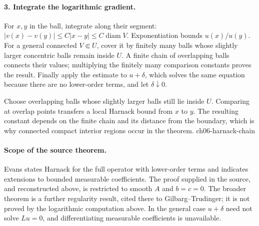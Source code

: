 \begin{expandedproof}
\paragraph{3. Integrate the logarithmic gradient.}
For $x,y$ in the ball, integrate along their segment:
$|v(x)-v(y)|\leq C|x-y|\leq C\operatorname{diam}V$.
Exponentiation bounds $u(x)/u(y)$.
For a general connected $V\Subset U$, cover it by finitely many balls
whose slightly larger concentric balls remain inside $U$.
A finite chain of overlapping balls connects their values; multiplying
the finitely many comparison constants proves the result.
Finally apply the estimate to $u+\delta$, which solves the same equation
because there are no lower-order terms, and let $\delta\downarrow0$.
\end{expandedproof}


{Choose overlapping balls whose slightly larger balls still lie inside $U$. Comparing at overlap points transfers a local Harnack bound from $x$ to $y$. The resulting constant depends on the finite chain and its distance from the boundary, which is why connected compact interior regions occur in the theorem.}
{ch06-harnack-chain}

\paragraph{Scope of the source theorem.}
Evans states Harnack for the full operator with lower-order terms
and indicates extensions to bounded measurable coefficients.
The proof supplied in the source, and reconstructed above, is restricted
to smooth $A$ and $b=c=0$. The broader theorem is a further regularity
result, cited there to Gilbarg--Trudinger; it is not proved by the
logarithmic computation above. In the general case $u+\delta$ need not
solve $Lu=0$, and differentiating measurable coefficients is unavailable.